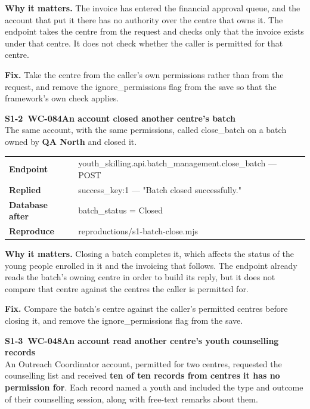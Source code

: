 \documentclass[10pt,a4paper]{article}
\newcommand{\display}{\sffamily}
\newcommand{\code}[1]{{\ttfamily #1}}
\begin{document}
\vspace{0.35em}
\textbf{Why it matters.} The invoice has entered the financial approval queue, and the account
that put it there has no authority over the centre that owns it. The endpoint takes the centre from
the request and checks only that the invoice exists under that centre. It does not check whether
the caller is permitted for that centre.

\textbf{Fix.} Take the centre from the caller's own permissions rather than from the request,
and remove the \code{ignore\_permissions} flag from the save so that the framework's own check
applies.

\vspace{0.8em}
{\display\small\bfseries\color{sevone}S1-2~{\footnotesize\color{muted}WC-084}\quad An account closed another centre's batch}\\[0.35em]
The same account, with the same permissions, called \code{close\_batch} on a batch owned by
\textbf{QA North} and closed it.

\vspace{0.3em}
{\footnotesize
\begin{tabularx}{\textwidth}{@{}p{2.45cm}L@{}}
\textbf{Endpoint} & \code{youth\_skilling.api.batch\_management.close\_batch} — \code{POST} \\
\textbf{Replied} & \code{success\_key:1} — "Batch closed successfully." \\
\textbf{Database after} & \code{batch\_status = Closed} \\
\textbf{Reproduce} & \code{reproductions/s1-batch-close.mjs} \\
\end{tabularx}\par}

\vspace{0.35em}
\textbf{Why it matters.} Closing a batch completes it, which affects the status of the young
people enrolled in it and the invoicing that follows. The endpoint already reads the batch's owning
centre in order to build its reply, but it does not compare that centre against the centres the
caller is permitted for.

\textbf{Fix.} Compare the batch's centre against the caller's permitted centres before closing
it, and remove the \code{ignore\_permissions} flag from the save.

\vspace{0.8em}
{\display\small\bfseries\color{sevone}S1-3~{\footnotesize\color{muted}WC-048}\quad An account read another centre's youth counselling records}\\[0.35em]
An Outreach Coordinator account, permitted for two centres, requested the counselling list and
received \textbf{ten of ten records from centres it has no permission for}. Each record named a
youth and included the type and outcome of their counselling session, along with free-text
remarks about them.
\end{document}
